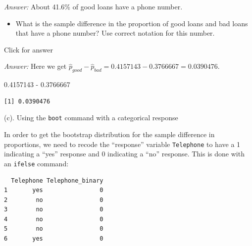 \documentclass[
]{book}
\newenvironment{Shaded}{\begin{snugshade}}{\end{snugshade}}
\newcommand{\DecValTok}[1]{\textcolor[rgb]{0.00,0.00,0.81}{#1}}
\newcommand{\FloatTok}[1]{\textcolor[rgb]{0.00,0.00,0.81}{#1}}
\newcommand{\FunctionTok}[1]{\textcolor[rgb]{0.00,0.00,0.00}{#1}}
\newcommand{\NormalTok}[1]{#1}
\newcommand{\OtherTok}[1]{\textcolor[rgb]{0.56,0.35,0.01}{#1}}
\newcommand{\SpecialCharTok}[1]{\textcolor[rgb]{0.00,0.00,0.00}{#1}}
\newcommand{\StringTok}[1]{\textcolor[rgb]{0.31,0.60,0.02}{#1}}
\providecommand{\tightlist}{%
  \setlength{\itemsep}{0pt}\setlength{\parskip}{0pt}}
\begin{document}
\emph{Answer:} About 41.6\% of good loans have a phone number.

\begin{itemize}
\tightlist
\item
  What is the sample difference in the proportion of good loans and bad loans that have a phone number? Use correct notation for this number.
\end{itemize}

Click for answer

\emph{Answer:} Here we get \(\hat{p}_{good} - \hat{p}_{bad} =0.4157143 - 0.3766667 = 0.0390476\).

\begin{Shaded}
\begin{Highlighting}[]
\FloatTok{0.4157143} \SpecialCharTok{{-}} \FloatTok{0.3766667}
\end{Highlighting}
\end{Shaded}

\begin{verbatim}
[1] 0.0390476
\end{verbatim}

(c). Using the \texttt{boot} command with a categorical response

In order to get the bootstrap distribution for the sample difference in proportions, we need to recode the ``response'' variable \texttt{Telephone} to have a 1 indicating a ``yes'' response and 0 indicating a ``no'' response. This is done with an \texttt{ifelse} command:

\begin{Shaded}
\end{Shaded}

\begin{verbatim}
  Telephone Telephone_binary
1       yes                0
2        no                0
3        no                0
4        no                0
5        no                0
6       yes                0
\end{verbatim}
\end{document}
